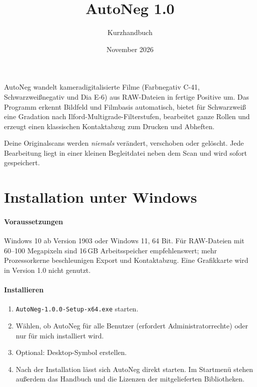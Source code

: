 \documentclass[a4paper,11pt,parskip=half,DIV=12]{scrartcl}
\title{AutoNeg 1.0}
\subtitle{Kurzhandbuch}
\date{November 2026}
\newcommand{\menu}[1]{\textsf{#1}}                    %
\newcommand{\datei}[1]{\texttt{#1}}                   %
\begin{document}
\maketitle

\noindent AutoNeg wandelt kameradigitalisierte Filme (Farbnegativ C-41, Schwarzweißnegativ und
Dia E-6) aus RAW-Dateien in fertige Positive um. Das Programm erkennt Bildfeld und Filmbasis
automatisch, bietet für Schwarzweiß eine Gradation nach Ilford-Multigrade-Filterstufen,
bearbeitet ganze Rollen und erzeugt einen klassischen Kontaktabzug zum Drucken und Abheften.

Deine Originalscans werden \emph{niemals} verändert, verschoben oder gelöscht. Jede Bearbeitung
liegt in einer kleinen Begleitdatei neben dem Scan und wird sofort gespeichert.

\tableofcontents

\section{Installation unter Windows}

\paragraph{Voraussetzungen} Windows 10 ab Version 1903 oder Windows 11, 64 Bit. Für RAW-Dateien
mit 60--100 Megapixeln sind 16\,GB Arbeitsspeicher empfehlenswert; mehr Prozessorkerne
beschleunigen Export und Kontaktabzug. Eine Grafikkarte wird in Version 1.0 nicht genutzt.

\paragraph{Installieren}
\begin{enumerate}
  \item \datei{AutoNeg-1.0.0-Setup-x64.exe} starten.
  \item Wählen, ob AutoNeg \menu{für alle Benutzer} (erfordert Administratorrechte) oder
        \menu{nur für mich} installiert wird.
  \item Optional: \menu{Desktop-Symbol erstellen}.
  \item Nach der Installation lässt sich AutoNeg direkt starten. Im Startmenü stehen außerdem
        das Handbuch und die Lizenzen der mitgelieferten Bibliotheken.
\end{enumerate}
\end{document}
